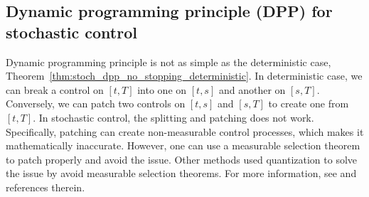 \documentclass[11pt]{book}
\begin{document}
\subsection{Dynamic programming principle (DPP) for stochastic control}
Dynamic programming principle is not as simple as the deterministic case, Theorem~\ref{thm:stoch_dpp_no_stopping_deterministic}. In deterministic case, we can break a control on $[t,T]$ into one on $[t,s]$ and another on $[s,T]$. Conversely, we can patch two controls on $[t,s]$ and $[s,T]$ to create one from $[t,T]$. In stochastic control, the splitting and patching does not work. Specifically, patching can create non-measurable control processes, which makes it mathematically inaccurate. However, one can use a measurable selection theorem to patch properly and avoid the issue. Other methods used quantization  to solve the issue by avoid measurable selection theorems. For more information, see \cite{Touzi12} and references therein.
\end{document}
